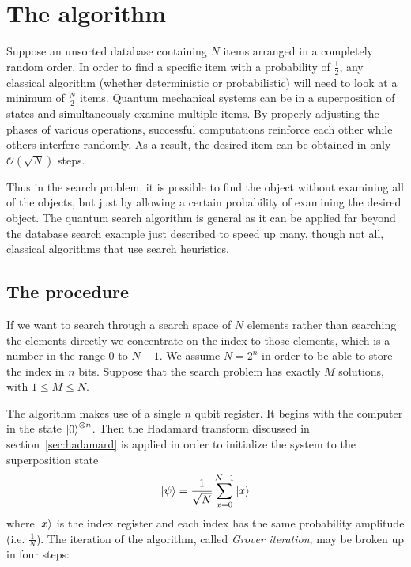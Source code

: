 \section{The algorithm}\label{sec:the-algorithm}
Suppose an unsorted database containing $N$ items arranged in a completely random order. In order to find a specific item with a probability of $\frac{1}{2}$, any classical algorithm (whether deterministic or probabilistic) will need to look at a minimum of $\frac{N}{2}$ items. Quantum mechanical systems can be in a superposition of states and simultaneously examine multiple items. By properly adjusting the phases of various operations, successful computations reinforce each other while others interfere randomly. As a result, the desired item can be obtained in only $\mathcal{O}(\sqrt{N})$ steps.

Thus in the search problem, it is possible to find the object without examining all of the objects, but just by allowing a certain probability of examining the desired object.
The quantum search algorithm is general as it can be applied far beyond the database search example just described to speed up many, though not all, classical algorithms that use search heuristics.

\subsection{The procedure}
If we want to search through a search space of $N$ elements rather than searching the elements directly we concentrate on the index to those elements, which is a number in the range $0$ to $N-1$. We assume $N=2^n$ in order to be able to store the index in $n$ bits. Suppose that the search problem has exactly $M$ solutions, with $1\leq M \leq N$.

The algorithm makes use of a single $n$ qubit register. It begins with the computer in the state $\ket{0}^{\otimes n}$. Then the Hadamard transform discussed in section~\ref{sec:hadamard} is applied in order to initialize the system to the superposition state
\begin{equation}\label{eq:initial-state}
   \ket{\psi} = \frac{1}{\sqrt{N}} \sum_{x=0}^{N-1}\ket{x}
\end{equation}
where $\ket{x}$ is the index register and each index has the same probability amplitude (i.e. $\frac{1}{N}$).
The iteration of the algorithm, called \emph{Grover iteration}, may be broken up in four steps:

